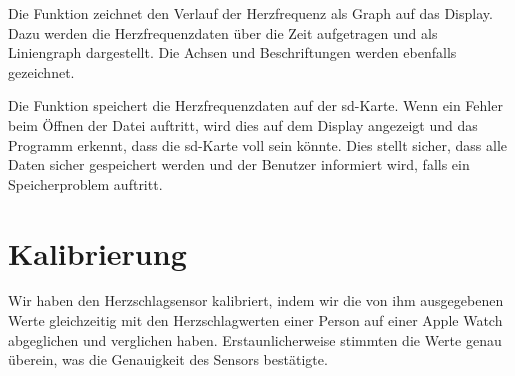 Die Funktion  zeichnet den Verlauf der Herzfrequenz als Graph auf das Display. Dazu werden die Herzfrequenzdaten über die Zeit aufgetragen und als Liniengraph dargestellt. Die Achsen und Beschriftungen werden ebenfalls gezeichnet. 


\begin{code}[h]
\end{code}

Die Funktion  speichert die Herzfrequenzdaten auf der \ac{sd}-Karte. Wenn ein Fehler beim Öffnen der Datei auftritt, wird dies auf dem Display angezeigt und das Programm erkennt, dass die \ac{sd}-Karte voll sein könnte. Dies stellt sicher, dass alle Daten sicher gespeichert werden und der Benutzer informiert wird, falls ein Speicherproblem auftritt.



\section{Kalibrierung}

Wir haben den Herzschlagsensor kalibriert, indem wir die von ihm ausgegebenen Werte gleichzeitig mit den Herzschlagwerten einer Person auf einer Apple Watch abgeglichen und verglichen haben. Erstaunlicherweise stimmten die Werte genau überein, was die Genauigkeit des Sensors bestätigte.

